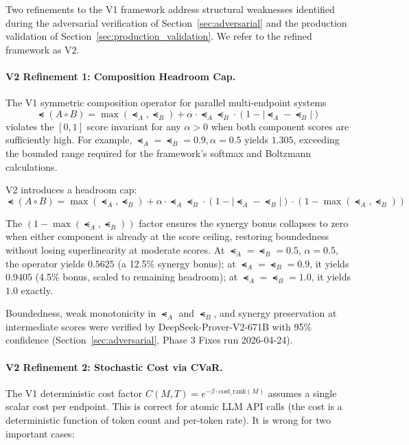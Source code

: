 Two refinements to the V1 framework address structural weaknesses identified during the adversarial verification of Section~\ref{sec:adversarial} and the production validation of Section~\ref{sec:production_validation}. We refer to the refined framework as V2.

\paragraph{V2 Refinement 1: Composition Headroom Cap.}
The V1 symmetric composition operator for parallel multi-endpoint systems
\[
\smt(A \circ B) = \max(\smt_A, \smt_B) + \alpha \cdot \smt_A \smt_B \cdot (1 - |\smt_A - \smt_B|)
\]
violates the $[0,1]$ score invariant for any $\alpha > 0$ when both component scores are sufficiently high. For example, $\smt_A = \smt_B = 0.9, \alpha = 0.5$ yields $1.305$, exceeding the bounded range required for the framework's softmax and Boltzmann calculations.

V2 introduces a headroom cap:
\begin{equation}
\label{eq:composition_v2}
\smt(A \circ B) = \max(\smt_A, \smt_B) + \alpha \cdot \smt_A \smt_B \cdot (1 - |\smt_A - \smt_B|) \cdot (1 - \max(\smt_A, \smt_B))
\end{equation}

The $(1 - \max(\smt_A, \smt_B))$ factor ensures the synergy bonus collapses to zero when either component is already at the score ceiling, restoring boundedness without losing superlinearity at moderate scores. At $\smt_A = \smt_B = 0.5$, $\alpha = 0.5$, the operator yields $0.5625$ (a 12.5\% synergy bonus); at $\smt_A = \smt_B = 0.9$, it yields $0.9405$ (4.5\% bonus, scaled to remaining headroom); at $\smt_A = \smt_B = 1.0$, it yields $1.0$ exactly.

Boundedness, weak monotonicity in $\smt_A$ and $\smt_B$, and synergy preservation at intermediate scores were verified by DeepSeek-Prover-V2-671B with 95\% confidence (Section~\ref{sec:adversarial}, Phase 3 Fixes run 2026-04-24).

\paragraph{V2 Refinement 2: Stochastic Cost via CVaR.}
The V1 deterministic cost factor $C(M, T) = e^{-\beta \cdot \text{cost\_rank}(M)}$ assumes a single scalar cost per endpoint. This is correct for atomic LLM API calls (the cost is a deterministic function of token count and per-token rate). It is wrong for two important cases:

